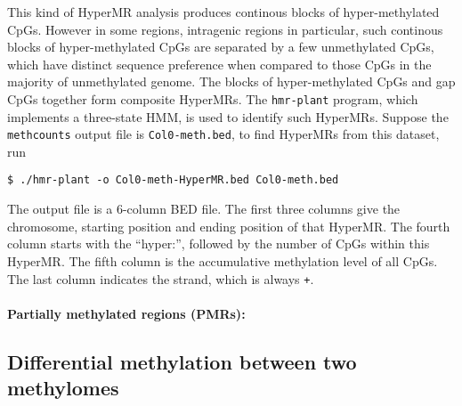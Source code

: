 \documentclass[10pt]{article}
\newcommand{\prog}[1]{\texttt{#1}}
\newcommand{\fn}[1]{\texttt{#1}}
\newcommand{\lit}[1]{\texttt{#1}}
\begin{document}
This kind of HyperMR analysis produces continous blocks of
hyper-methylated CpGs. However in some regions, intragenic regions in
particular, such continous blocks of hyper-methylated CpGs are
separated by a few unmethylated CpGs, which have distinct sequence
preference when compared to those CpGs in the majority of unmethylated
genome. The blocks of hyper-methylated CpGs and gap CpGs together form
composite HyperMRs. The \prog{hmr-plant} program, which implements a
three-state HMM, is used to identify such HyperMRs. Suppose the
\prog{methcounts} output file is  \fn{Col0-meth.bed}, to find HyperMRs
from this dataset, run
\begin{verbatim}
$ ./hmr-plant -o Col0-meth-HyperMR.bed Col0-meth.bed
\end{verbatim}
The output file is a 6-column BED file. The first three columns give
the chromosome, starting position and ending position of that
HyperMR. The fourth column starts with the ``hyper:'', followed by the
number of CpGs within this HyperMR. The fifth column is the
accumulative methylation level of all CpGs. The last column indicates
the strand, which is always \lit{+}.


\paragraph{Partially methylated regions (PMRs):}





\subsection{Differential methylation between two methylomes}
\label{sec:differential_methylation}
\end{document}
